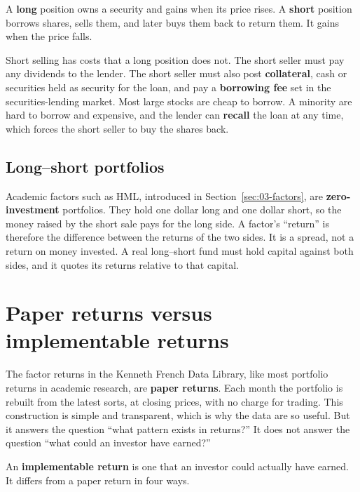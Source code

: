 A \textbf{long} position owns a security and gains when its price rises. A \textbf{short} position borrows shares, sells them, and later buys them back to return them. It gains when the price falls.

Short selling has costs that a long position does not. The short seller must pay any dividends to the lender. The short seller must also post \textbf{collateral}, cash or securities held as security for the loan, and pay a \textbf{borrowing fee} set in the securities-lending market. Most large stocks are cheap to borrow. A minority are hard to borrow and expensive, and the lender can \textbf{recall} the loan at any time, which forces the short seller to buy the shares back.

\subsection{Long--short portfolios}

Academic factors such as HML, introduced in Section~\ref{sec:03-factors}, are \textbf{zero-investment} portfolios. They hold one dollar long and one dollar short, so the money raised by the short sale pays for the long side. A factor's ``return'' is therefore the difference between the returns of the two sides. It is a spread, not a return on money invested. A real long--short fund must hold capital against both sides, and it quotes its returns relative to that capital.

\section{Paper returns versus implementable returns}
\label{sec:04-paper}

The factor returns in the Kenneth French Data Library, like most portfolio returns in academic research, are \textbf{paper returns}. Each month the portfolio is rebuilt from the latest sorts, at closing prices, with no charge for trading. This construction is simple and transparent, which is why the data are so useful. But it answers the question ``what pattern exists in returns?'' It does not answer the question ``what could an investor have earned?''

An \textbf{implementable return} is one that an investor could actually have earned. It differs from a paper return in four ways.

